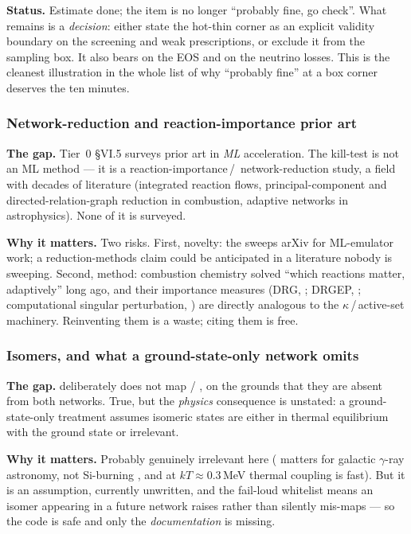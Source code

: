 \textbf{Status.} Estimate done; the item is no longer ``probably fine, go
check''. What remains is a \emph{decision}: either state the hot-thin corner as
an explicit validity boundary on the screening and weak prescriptions, or
exclude it from the sampling box. It also bears on the EOS and on the neutrino
losses. This is the cleanest illustration in the whole list of why ``probably
fine'' at a box corner deserves the ten minutes.

\subsubsection{Network-reduction and reaction-importance prior art}
\label{sec:gap-reduction}

\textbf{The gap.} Tier~0 \S VI.5 surveys prior art in \emph{ML} acceleration.
The kill-test is not an ML method --- it is a reaction-importance\,/\,%
network-reduction study, a field with decades of literature (integrated reaction
flows, principal-component and directed-relation-graph reduction in combustion,
adaptive networks in astrophysics). None of it is surveyed.

\textbf{Why it matters.} Two risks. First, novelty: the 
sweeps arXiv for ML-emulator work; a reduction-methods claim could be
anticipated in a literature nobody is sweeping. Second, method: combustion
chemistry solved ``which reactions matter, adaptively'' long ago, and their
importance measures (DRG, \citealp{lu2005}; DRGEP,
\citealp{pepiot2008}; computational singular perturbation,
\citealp{lam1994}) are directly analogous to the $\kappa$\,/\,active-set
machinery. Reinventing them is a waste; citing them is free.

\subsubsection{Isomers, and what a ground-state-only network omits}
\label{sec:gap-isomers}

\textbf{The gap.}  deliberately does not map  /
, on the grounds that they are absent from both networks. True, but
the \emph{physics} consequence is unstated: a ground-state-only treatment
assumes isomeric states are either in thermal equilibrium with the ground state
or irrelevant.

\textbf{Why it matters.} Probably genuinely irrelevant here (
matters for galactic $\gamma$-ray astronomy, not Si-burning \Ye, and at
$kT \approx 0.3$\,MeV thermal coupling is fast). But it is an assumption,
currently unwritten, and the fail-loud whitelist means an isomer appearing in a
future network raises rather than silently mis-maps --- so the code is safe and
only the \emph{documentation} is missing.

